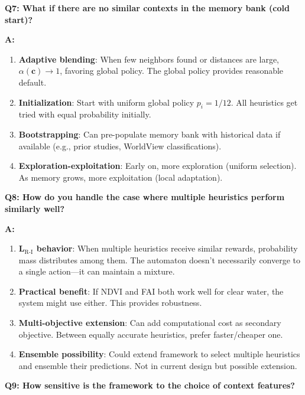 \documentclass[11pt]{article}
\begin{document}
\textbf{Q7: What if there are no similar contexts in the memory bank (cold start)?}

\textbf{A:}

\begin{enumerate}
    \item \textbf{Adaptive blending}: When few neighbors found or distances are large, $\alpha(\mathbf{c}) \to 1$, favoring global policy. The global policy provides reasonable default.

    \item \textbf{Initialization}: Start with uniform global policy $p_i = 1/12$. All heuristics get tried with equal probability initially.

    \item \textbf{Bootstrapping}: Can pre-populate memory bank with historical data if available (e.g., prior studies, WorldView classifications).

    \item \textbf{Exploration-exploitation}: Early on, more exploration (uniform selection). As memory grows, more exploitation (local adaptation).
\end{enumerate}

\textbf{Q8: How do you handle the case where multiple heuristics perform similarly well?}

\textbf{A:}

\begin{enumerate}
    \item \textbf{L$_{\text{R-I}}$ behavior}: When multiple heuristics receive similar rewards, probability mass distributes among them. The automaton doesn't necessarily converge to a single action---it can maintain a mixture.

    \item \textbf{Practical benefit}: If NDVI and FAI both work well for clear water, the system might use either. This provides robustness.

    \item \textbf{Multi-objective extension}: Can add computational cost as secondary objective. Between equally accurate heuristics, prefer faster/cheaper one.

    \item \textbf{Ensemble possibility}: Could extend framework to select multiple heuristics and ensemble their predictions. Not in current design but possible extension.
\end{enumerate}

\textbf{Q9: How sensitive is the framework to the choice of context features?}
\end{document}
